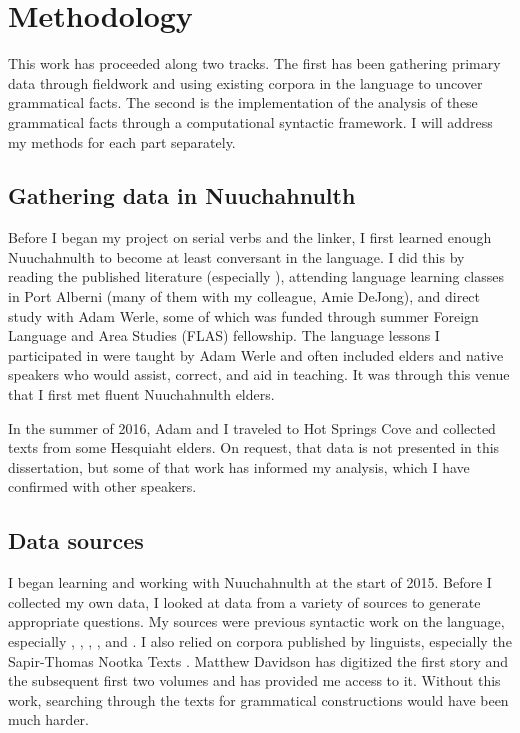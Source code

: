\chapter{Methodology} \label{ch:methodology}

This work has proceeded along two tracks. The first has been gathering primary data through fieldwork and using existing corpora in the language to uncover grammatical facts. The second is the implementation of the analysis of these grammatical facts through a computational syntactic framework. I will address my methods for each part separately.

\section{Gathering data in Nuuchahnulth} \label{ch:method:ncn}

Before I began my project on serial verbs and the linker, I first learned enough Nuuchahnulth to become at least conversant in the language. I did this by reading the published literature (especially \citealt{sapir1939}), attending language learning classes in Port Alberni (many of them with my colleague, Amie DeJong), and direct study with Adam Werle, some of which was funded through summer Foreign Language and Area Studies (FLAS) fellowship. The language lessons I participated in were taught by Adam Werle and often included elders and native speakers who would assist, correct, and aid in teaching. It was through this venue that I first met fluent Nuuchahnulth elders.

In the summer of 2016, Adam and I traveled to Hot Springs Cove and collected texts from some Hesquiaht elders. On request, that data is not presented in this dissertation, but some of that work has informed my analysis, which I have confirmed with other speakers.

\section{Data sources} \label{ch:method:sources}

I began learning and working with Nuuchahnulth at the start of 2015. Before I collected my own data, I looked at data from a variety of sources to generate appropriate questions. My sources were previous syntactic work on the language, especially \citet{jacobsen1993}, \citet{nakayama2001}, \citet{wojdak2003}, \citet{waldie2004}, and \citet{woo2007b}. I also relied on corpora published by linguists, especially the Sapir-Thomas Nootka Texts \citep{sapir1924, sapir1939, sapir1955, whalingindians2000, whalingindians2004, wolfritual2007, whalingindians2009}. Matthew Davidson has digitized the first story and the subsequent first two volumes \citep{sapir1924,sapir1939,sapir1955} and has provided me access to it. Without this work, searching through the texts for grammatical constructions would have been much harder.

